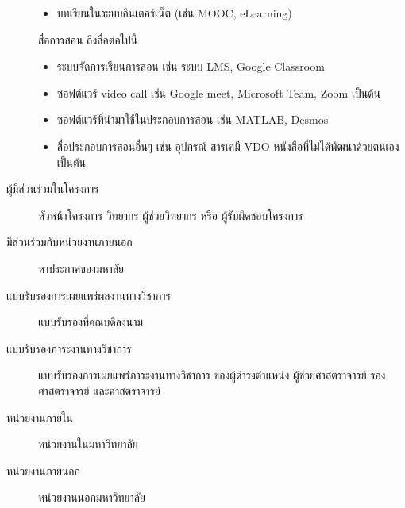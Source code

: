 \documentclass[a4paper,12pt,english]{sphinxmanual}
\begin{document}
\begin{description}
\begin{itemize}
\item {} 
บทเรียนในระบบอินเตอร์เน็ต (เช่น MOOC, e\sphinxhyphen{}Learning)

\end{itemize}

สื่อการสอน  ถึงสื่อต่อไปนี้
\begin{itemize}
\item {} 
ระบบจัดการเรียนการสอน เช่น ระบบ LMS, Google Classroom

\item {} 
ซอฟต์แวร์ video call เช่น Google meet, Microsoft Team, Zoom เป็นต้น

\item {} 
ซอฟต์แวร์ที่นำมาใช้ในประกอบการสอน เช่น MATLAB, Desmos

\item {} 
สื่อประกอบการสอนอื่นๆ เช่น อุปกรณ์ สารเคมี VDO หนังสือที่ไม่ได้พัฒนาด้วยตนเอง เป็นต้น

\end{itemize}

\item[{ผู้มีส่วนร่วมในโครงการ\index{ผู้มีส่วนร่วมในโครงการ@\spxentry{ผู้มีส่วนร่วมในโครงการ}|spxpagem}\phantomsection\label{\detokenize{glossary:term-5}}}] \leavevmode
หัวหน้าโครงการ วิทยากร ผู้ช่วยวิทยากร หรือ ผู้รับผิดชอบโครงการ

\item[{มีส่วนร่วมกับหน่วยงานภายนอก\index{มีส่วนร่วมกับหน่วยงานภายนอก@\spxentry{มีส่วนร่วมกับหน่วยงานภายนอก}|spxpagem}\phantomsection\label{\detokenize{glossary:term-6}}}] \leavevmode
หาประกาศของมหาลัย

\item[{แบบรับรองการเผยแพร่ผลงานทางวิชาการ\index{แบบรับรองการเผยแพร่ผลงานทางวิชาการ@\spxentry{แบบรับรองการเผยแพร่ผลงานทางวิชาการ}|spxpagem}\phantomsection\label{\detokenize{glossary:term-7}}}] \leavevmode
แบบรับรองที่คณบดีลงนาม

\item[{แบบรับรองภาระงานทางวิชาการ\index{แบบรับรองภาระงานทางวิชาการ@\spxentry{แบบรับรองภาระงานทางวิชาการ}|spxpagem}\phantomsection\label{\detokenize{glossary:term-8}}}] \leavevmode
แบบรับรองการเผยแพร่ภาระงานทางวิชาการ ของผู้ดำรงตำแหน่ง ผู้ช่วยศาสตราจารย์ รองศาสตราจารย์ และศาสตราจารย์

\item[{หน่วยงานภายใน\index{หน่วยงานภายใน@\spxentry{หน่วยงานภายใน}|spxpagem}\phantomsection\label{\detokenize{glossary:term-9}}}] \leavevmode
หน่วยงานในมหาวิทยาลัย

\item[{หน่วยงานภายนอก\index{หน่วยงานภายนอก@\spxentry{หน่วยงานภายนอก}|spxpagem}\phantomsection\label{\detokenize{glossary:term-10}}}] \leavevmode
หน่วยงานนอกมหาวิทยาลัย


\end{description}
\end{document}
